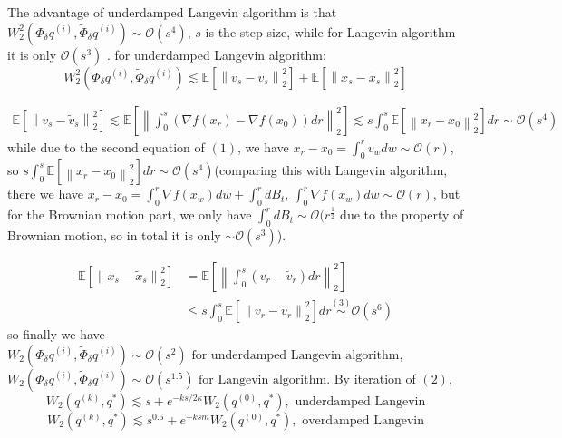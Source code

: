 \documentclass[12pt,a4paper]{article}
\begin{document}
The advantage of underdamped Langevin algorithm is that $W_{2}^{2}\left(\Phi_{\delta} q^{(i)}, \tilde{\Phi}_{\delta} q^{(i)}\right)\sim \mathcal{O}(s^4)$, $s$ is the step size, while for Langevin algorithm it is only $\mathcal{O}(s^3)$ .
\newline
for underdamped Langevin algorithm: $$W_{2}^{2}\left(\Phi_{\delta} q^{(i)}, \tilde{\Phi}_{\delta} q^{(i)}\right)\lesssim \mathbb{E}\left[\left\|v_{s}-\tilde{v}_{s}\right\|_{2}^{2}\right]+	\mathbb{E}\left[\left\|x_{s}-\tilde{x}_{s}\right\|_{2}^{2}\right]$$

\begin{equation}
	\begin{aligned}
		\mathbb{E}\left[\left\|v_{s}-\tilde{v}_{s}\right\|_{2}^{2}\right]\lesssim \mathbb{E}\left[\left\| \int_{0}^{s} \left(\nabla f\left(x_{r}\right)-\nabla f\left(x_{0}\right)\right) d r\right\|_{2}^{2}\right]
		 \stackrel{}{\lesssim} s \int_{0}^{s} \mathbb{E}\left[\left\|x_{r}-x_{0}\right\|_{2}^{2}\right] d r\sim\mathcal{O}(s^4)
	\end{aligned}
\end{equation}
while due to the second equation of $(1)$, we have $x_r-x_0=\int_0^r v_wdw\sim \mathcal{O}(r)$, so 
$s \int_{0}^{s} \mathbb{E}\left[\left\|x_{r}-x_{0}\right\|_{2}^{2}\right] d r\sim\mathcal{O}(s^4)$(comparing this with Langevin algorithm, there we have $x_r-x_0=\int_0^r\nabla f(x_w)dw+\int_0^rdB_t$, $\int_0^r\nabla f(x_w)dw\sim \mathcal{O}(r)$, but for the Brownian motion part, we only have $\int_0^rdB_t\sim\mathcal{O}(r^{\frac{1}{2}}$ due to the property of Brownian motion, so in total it is only $\sim\mathcal{O}(s^3)$).

\begin{equation}
	\begin{aligned}
		\mathbb{E}\left[\left\|x_{s}-\tilde{x}_{s}\right\|_{2}^{2}\right] &=\mathbb{E}\left[\left\|\int_{0}^{s}\left(v_{r}-\tilde{v}_{r}\right) d r\right\|_{2}^{2}\right] \\
		& \leq s \int_{0}^{s} \mathbb{E}\left[\left\|v_{r}-\tilde{v}_{r}\right\|_{2}^{2}\right] d r\overset{(3)}{\sim}\mathcal{O}(s^6)
	\end{aligned}
\end{equation}
so finally we have $W_{2}\left(\Phi_{\delta} q^{(i)}, \tilde{\Phi}_{\delta} q^{(i)}\right)\sim\mathcal{O}(s^2) \text{  for underdamped Langevin algorithm}$, $W_{2}\left(\Phi_{\delta} q^{(i)}, \tilde{\Phi}_{\delta} q^{(i)}\right)\sim\mathcal{O}(s^{1.5}) \text{  for Langevin algorithm}$.
\newline
 By iteration of $(2)$, 
\begin{equation*}
	W_2(q^{(k)},q^*)\lesssim s+e^{-ks/2\kappa}W_2(q^{(0)},q^*),    \text{     underdamped Langevin}
\end{equation*}
\begin{equation*}
	W_2(q^{(k)},q^*)\lesssim s^{0.5}+e^{-ksm}W_2(q^{(0)},q^*),    \text{      overdamped Langevin}
\end{equation*}
\end{document}
